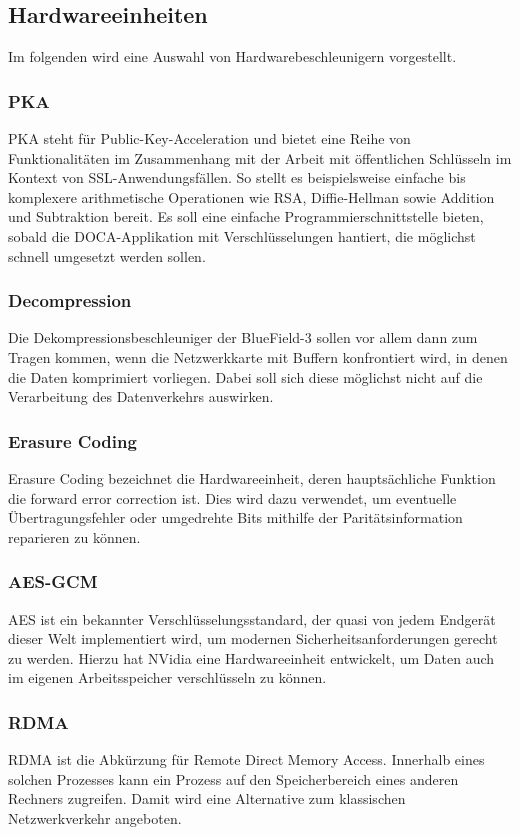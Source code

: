 \subsection{Hardwareeinheiten}
Im folgenden wird eine Auswahl von Hardwarebeschleunigern vorgestellt.
\subsubsection{PKA}
PKA steht für Public-Key-Acceleration und bietet eine Reihe von Funktionalitäten im Zusammenhang mit der Arbeit mit öffentlichen Schlüsseln im Kontext von SSL-Anwendungsfällen. So stellt es beispielsweise einfache bis komplexere arithmetische Operationen wie RSA, Diffie-Hellman sowie Addition und Subtraktion bereit. Es soll eine einfache Programmierschnittstelle bieten, sobald die DOCA-Applikation mit Verschlüsselungen hantiert, die möglichst schnell umgesetzt werden sollen.
\subsubsection{Decompression}
Die Dekompressionsbeschleuniger der BlueField-3 sollen vor allem dann zum Tragen kommen, wenn die Netzwerkkarte mit Buffern konfrontiert wird, in denen die Daten komprimiert vorliegen. Dabei soll sich diese möglichst nicht auf die Verarbeitung des Datenverkehrs auswirken.
\subsubsection{Erasure Coding}
Erasure Coding bezeichnet die Hardwareeinheit, deren hauptsächliche Funktion die forward error correction ist. Dies wird dazu verwendet, um eventuelle Übertragungsfehler oder umgedrehte Bits mithilfe der Paritätsinformation reparieren zu können.
\subsubsection{AES-GCM}
AES ist ein bekannter Verschlüsselungsstandard, der quasi von jedem Endgerät dieser Welt implementiert wird, um modernen Sicherheitsanforderungen gerecht zu werden. Hierzu hat NVidia eine Hardwareeinheit entwickelt, um Daten auch im eigenen Arbeitsspeicher verschlüsseln zu können.
\subsubsection{RDMA}
RDMA ist die Abkürzung für Remote Direct Memory Access. Innerhalb eines solchen Prozesses kann ein Prozess auf den Speicherbereich eines anderen Rechners zugreifen. Damit wird eine Alternative zum klassischen Netzwerkverkehr angeboten.

